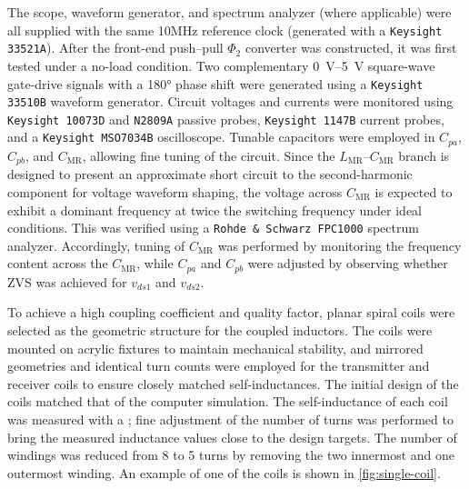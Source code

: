 \documentclass[journal, 9pt, letterpaper, english]{IEEEtran}[2015/08/26]
\begin{document}
The scope, waveform generator, and spectrum analyzer (where applicable) were all supplied with the same 10MHz reference clock (generated with a \verb|Keysight 33521A|).
After the front-end push--pull $\Phi_2$ converter was constructed, it was first tested under a no-load condition. Two complementary \qtyrange{0}{5}{\volt} square-wave gate-drive signals with a 180\unit{\degree} phase shift were generated using a \verb|Keysight 33510B| waveform generator.
Circuit voltages and currents were monitored using \verb|Keysight 10073D| and \verb|N2809A| passive probes, \verb|Keysight 1147B| current probes, and a \verb|Keysight MSO7034B| oscilloscope.
Tunable capacitors were employed in $C_{pa}$, $C_{pb}$, and $C_{\mathrm{MR}}$, allowing fine tuning of the circuit. Since the $L_{\mathrm{MR}}$--$C_{\mathrm{MR}}$ branch is designed to present an approximate short circuit to the second-harmonic component for voltage waveform shaping, the voltage across $C_{\mathrm{MR}}$ is expected to exhibit a dominant frequency at twice the switching frequency under ideal conditions.
This was verified using a \verb|Rohde & Schwarz FPC1000| spectrum analyzer.
Accordingly, tuning of $C_{\mathrm{MR}}$ was performed by monitoring the frequency content across the $C_{\mathrm{MR}}$, while $C_{pa}$ and $C_{pb}$ were adjusted by observing whether ZVS was achieved for $v_{ds1}$ and $v_{ds2}$.

To achieve a high coupling coefficient and quality factor, planar spiral coils were selected as the geometric structure for the coupled inductors.
The coils were mounted on acrylic fixtures to maintain mechanical stability, and mirrored geometries and identical turn counts were employed for the transmitter and receiver coils to ensure closely matched self-inductances.
The initial design of the coils matched that of the computer simulation.
The self-inductance of each coil was measured with a \vna; fine adjustment of the number of turns was performed to bring the measured inductance values close to the design targets.
The number of windings was reduced from 8 to 5 turns by removing the two innermost and one outermost winding.
An example of one of the coils is shown in \cref{fig:single-coil}.
\end{document}
